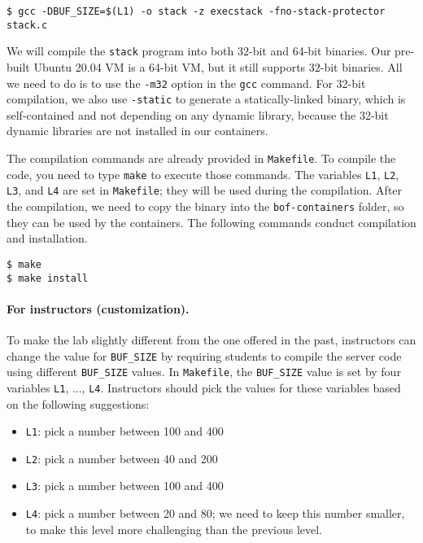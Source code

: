 \begin{lstlisting}
$ gcc -DBUF_SIZE=$(L1) -o stack -z execstack -fno-stack-protector stack.c
\end{lstlisting}

\ifdefined\arm
\else
We will compile the \texttt{stack} program into both 32-bit and 64-bit 
binaries. Our pre-built Ubuntu 20.04 VM is a 64-bit VM, but it 
still supports 32-bit binaries. All we need to do is to 
use the \texttt{-m32} option in the \texttt{gcc} command. 
For 32-bit compilation, we also use \texttt{-static} to generate 
a statically-linked binary, which is self-contained and not depending
on any dynamic library, because the 32-bit dynamic libraries 
are not installed in our containers. 
\fi

The compilation commands are already provided in \texttt{Makefile}. To compile
the code, you need to type \texttt{make} to execute those commands.
The variables \texttt{L1}, \texttt{L2}, \texttt{L3}, and \texttt{L4} are
set in \texttt{Makefile}; they will be used during the compilation.
After the compilation, we need to copy the binary into
the \texttt{bof-containers} folder, so they can be used by the 
containers. The following commands conduct compilation and 
installation.

\begin{lstlisting}
$ make
$ make install
\end{lstlisting}
 

\paragraph{For instructors (customization).}
To make the lab slightly different from the one offered in the past,
instructors can change the value for \texttt{BUF\_SIZE} by requiring
students to compile the server code using different \texttt{BUF\_SIZE} values.
In \texttt{Makefile}, the \texttt{BUF\_SIZE} value is set by
four variables \texttt{L1}, ..., \texttt{L4}.
Instructors should pick the values for these variables based
on the following suggestions:

\begin{itemize}[noitemsep]
\item \texttt{L1}: pick a number between 100 and 400
\item \texttt{L2}: pick a number between 40 and 200
\item \texttt{L3}: pick a number between 100 and 400
\item \texttt{L4}: pick a number between 20 and 80;
we need to keep this number smaller, to make this level more challenging 
than the previous level. 
\end{itemize}




